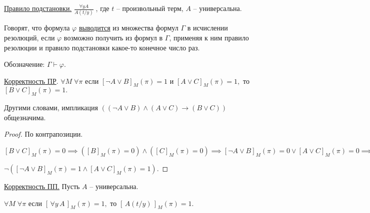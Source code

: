 \documentclass[a4paper, fleqn]{article}
\begin{document}
    \underline{Правило подстановки.} $\boxed{\frac{\forall y A}{A(t/y)}} \; $, где $t$ -- произвольный терм, $A$ -- универсальна.


    Говорят, что формула $\varphi$ \underline{выводится} из множества  формул $\Gamma$ в исчислении резолюций, если $\varphi$ возможно получить из формул в $\Gamma$, применяя к ним правило резолюции и правило подстановки какое-то конечное число раз.

    Обозначение: $\Gamma \vdash \varphi.$

    \underline{Корректность ПР}. $\forall M \; \forall \pi$ если $[\neg A \lor B]_M (\pi) = 1$  и $[ A \lor C]_M (\pi) = 1,$ то $[B \lor C]_M (\pi) = 1.$

    Другими словами, импликация $( (\neg A \lor B) \land (A \lor C) \to (B \lor C) )$ общезначима.

    \begin{proof} По контрапозиции.

    $[B \lor C]_M (\pi) = 0 \implies \left([B]_M (\pi) = 0\right) \land \left([C]_M (\pi) = 0\right) \implies [\neg A \lor B]_M (\pi) = 0 \lor   [ A \lor C]_M (\pi) = 0 \implies$

    $ \neg([\neg A \lor B]_M (\pi) = 1 \land   [ A \lor C]_M (\pi) = 1).$
    \end{proof}


    \underline{Корректность ПП.} Пусть $A$ -- универсальна.

    $\forall M \; \forall \pi$ если $[ \, \forall y \,  A \, ]_M (\pi) = 1,$  то $[ \, A(t/y) \, ]_M (\pi) = 1.$
\end{document}
